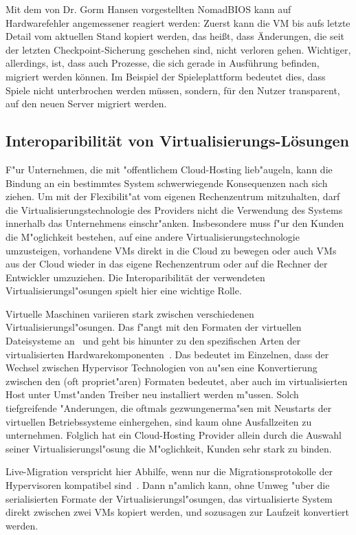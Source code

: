 \documentclass[draft,journal]{IEEEtran}
\begin{document}
Mit dem von Dr. Gorm Hansen vorgestellten NomadBIOS kann auf Hardwarefehler
angemessener reagiert werden: Zuerst kann die VM bis aufs letzte
Detail vom aktuellen Stand kopiert werden, das heißt, dass Änderungen,
die seit der letzten Checkpoint-Sicherung geschehen sind, nicht
verloren gehen. Wichtiger, allerdings, ist, dass auch Prozesse, die
sich gerade in Ausführung befinden, migriert werden können. Im
Beispiel der Spieleplattform bedeutet dies, dass Spiele nicht
unterbrochen werden müssen, sondern, für den Nutzer transparent, auf
den neuen Server migriert werden.

\subsection{Interoparibilität von Virtualisierungs-Lösungen}
F"ur Unternehmen, die mit "offentlichem Cloud-Hosting lieb"augeln,
kann die Bindung an ein bestimmtes System schwerwiegende Konsequenzen
nach sich ziehen. Um mit der Flexibilit"at vom eigenen Rechenzentrum
mitzuhalten, darf die Virtualisierungstechnologie des Providers nicht
die Verwendung des Systems innerhalb das Unternehmens
einschr"anken. Insbesondere muss f"ur den Kunden die M"oglichkeit
bestehen, auf eine andere Virtualisierungstechnologie umzusteigen,
vorhandene VMs direkt in die Cloud zu bewegen oder auch VMs aus der
Cloud wieder in das eigene Rechenzentrum oder auf die Rechner der
Entwickler umzuziehen. Die Interoparibilität der verwendeten
Virtualisierungsl"osungen spielt hier eine wichtige Rolle.

Virtuelle Maschinen variieren stark zwischen verschiedenen
Virtualisierungsl"osungen. Das f"angt mit den Formaten der virtuellen
Dateisysteme an~\cite{none} und geht bis hinunter zu den spezifischen
Arten der virtualisierten Hardwarekomponenten~\cite{none}. Das
bedeutet im Einzelnen, dass der Wechsel zwischen Hypervisor
Technologien von au"sen eine Konvertierung zwischen den (oft
propriet"aren) Formaten bedeutet, aber auch im virtualisierten Host
unter Umst"anden Treiber neu installiert werden m"ussen. Solch
tiefgreifende "Anderungen, die oftmals gezwungenerma"sen mit Neustarts
der virtuellen Betriebssysteme einhergehen, sind kaum ohne
Ausfallzeiten zu unternehmen. Folglich hat ein Cloud-Hosting Provider
allein durch die Auswahl seiner Virtualisierungsl"osung die
M"oglichkeit, Kunden sehr stark zu binden.

Live-Migration verspricht hier Abhilfe, wenn nur die
Migrationsprotokolle der Hypervisoren kompatibel
sind~\cite{none}. Dann n"amlich kann, ohne Umweg "uber die
serialisierten Formate der Virtualisierungsl"osungen, das
virtualisierte System direkt zwischen zwei VMs kopiert werden, und
sozusagen zur Laufzeit konvertiert werden.
\end{document}
